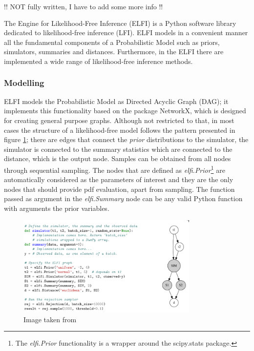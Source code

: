 !! NOT fully written, I have to add some more info !!

The Engine for Likelihood-Free Inference (ELFI) \cite{1708.00707} is a Python software library dedicated to likelihood-free inference (LFI). ELFI models in a convenient manner all the fundamental components of a Probabilistic Model such as priors, simulators, summaries and distances. Furthermore, in the ELFI there are implemented a wide range of likelihood-free inference methods.

\subsubsection{Modelling}
\label{sec:modelling}

ELFI models the Probabilistic Model as Directed Acyclic Graph (DAG);
it implements this functionality based on the package NetworkX, which
is designed for creating general purpose graphs. Although not
restricted to that, in most cases the structure of a likelihood-free
model follows the pattern presented in figure \ref{fig:elfi-model};
there are edges that connect the \textit{prior} distributions to the
simulator, the simulator is connected to the summary statistics which
are connected to the distance, which is the output node. Samples can
be obtained from all nodes through sequential sampling. The nodes that
are defined as \textit{elfi.Prior}\footnote{The \textit{elfi.Prior}
  functionality is a wrapper around the scipy.stats package.} are
automatically considered as the parameters of interest and they are
the only nodes that should provide pdf evaluation, apart from
sampling. The function passed as argument in the \textit{elfi.Summary}
node can be any valid Python function with arguments the prior
variables.

\begin{figure}[!ht]
    \begin{center}
      \includegraphics[width=0.8\textwidth]{./Thesis/images/chapter2/elfi.png}
    \end{center}
    \caption{Image taken from \cite{1708.00707}}
    \label{fig:elfi-model}
\end{figure}


